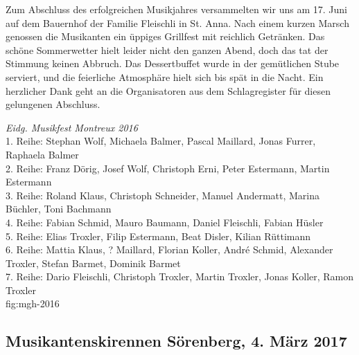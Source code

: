 \begin{history}
    Zum Abschluss des erfolgreichen Musikjahres versammelten wir uns am 17. Juni
    auf dem Bauernhof der Familie Fleischli in St. Anna. Nach einem kurzen
    Marsch genossen die Musikanten ein üppiges Grillfest mit reichlich
    Getränken. Das schöne Sommerwetter hielt leider nicht den ganzen Abend, doch
    das tat der Stimmung keinen Abbruch. Das Dessertbuffet wurde in der
    gemütlichen Stube serviert, und die feierliche Atmosphäre hielt sich bis
    spät in die Nacht. Ein herzlicher Dank geht an die Organisatoren aus dem
    Schlagregister für diesen gelungenen Abschluss.

\end{history}


{\emph{Eidg. Musikfest Montreux 2016}\\
    1. Reihe: Stephan Wolf, Michaela Balmer, Pascal Maillard, Jonas Furrer,
    Raphaela Balmer\\
    2. Reihe: Franz Dörig, Josef Wolf, Christoph Erni, Peter Estermann, Martin
    Estermann\\
    3. Reihe: Roland Klaus, Christoph Schneider, Manuel Andermatt, Marina
    Büchler, Toni Bachmann\\
    4. Reihe: Fabian Schmid, Mauro Baumann, Daniel Fleischli, Fabian Hüsler\\
    5. Reihe: Elias Troxler, Filip Estermann, Beat Disler, Kilian Rüttimann\\
    6. Reihe: Mattia Klaus, ? Maillard, Florian Koller, André Schmid, Alexander
    Troxler, Stefan Barmet, Dominik Barmet\\
    7. Reihe: Dario Fleischli, Christoph Troxler, Martin Troxler, Jonas Koller,
    Ramon Troxler\\
} {fig:mgh-2016}


\subsection*{Musikantenskirennen Sörenberg, 4. März 2017}

